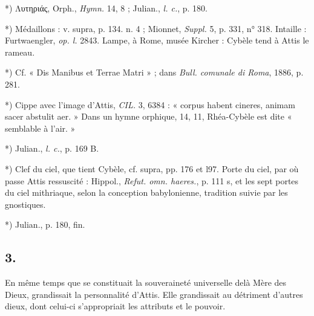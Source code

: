 \documentclass[a4paper, 11pt, oneside, polutonikogreek, french]{article}
\begin{document}
*) Λυτηριάς, Orph., \emph{Hymn.} 14, 8 ; Julian., \emph{l. c.}, p. 180.

*) Médaillons : v. supra, p. 134. n. 4 ; Mionnet, \emph{Suppl.} 5, p. 331, n° 318. Intaille : Furtwaengler, \emph{op. l.} 2843. Lampe, à Rome, musée Kircher : Cybèle tend à Attis le rameau.

*) Cf. « Dis Manibus et Terrae Matri » ; dans \emph{Bull. comunale di Roma}, 1886, p. 281.

*) Cippe avec l'image d'Attis, \emph{CIL.} 3, 6384 : « corpus habent cineres, animam sacer abstulit aer. » Dans un hymne orphique, 14, 11, Rhéa-Cybèle est dite « semblable à l'air. »

*) Julian., \emph{l. c.}, p. 169 B.

*) Clef du ciel, que tient Cybèle, cf. supra, pp. 176 et l97. Porte du ciel, par où passe Attis ressuscité : Hippol., \emph{Refut. omn. haeres.}, p. 111 s, et les sept portes du ciel mithriaque, selon la conception babylonienne, tradition suivie par les gnostiques.

*) Julian., p. 180, fin.

\subsection{3.}

En même temps que se constituait la souveraineté universelle delà Mère des Dieux, grandissait la personnalité d'Attis. Elle grandissait au détriment d'autres dieux, dont celui-ci s'appropriait les attributs et le pouvoir.
\end{document}
